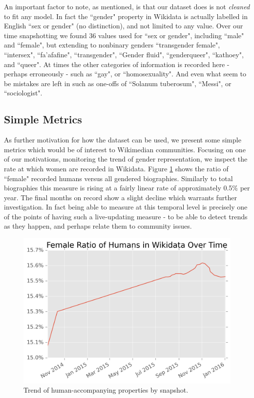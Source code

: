 \documentclass[letterpaper]{article}
\begin{document}
An important factor to note, as mentioned, is that our dataset does is not \textit{cleaned} to fit any model. In fact the ``gender" property in Wikidata is actually labelled in English ``sex or gender" (no distinction), and not limited to any value. Over our time snapshotting we found 36 values used for ``sex or gender", including ``male" and ``female", but extending to nonbinary genders ``transgender female", ``intersex", ``fa'afafine", ``transgender", ``Gender fluid",  ``genderqueer", ``kathoey", and ``queer". At times the other categories of information is recorded here - perhaps erroneously - such as ``gay", or ``homosexuality". And even what seem to be mistakes are left in such as one-offs of ``Solanum tuberosum", ``Messi", or ``sociologist".

\subsection{Simple Metrics}
As further motivation for how the dataset can be used, we present some simple metrics which would be of interest to Wikimedian communities. Focusing on one of our motivations, monitoring the trend of gender representation, we inspect the rate at which women are recorded in Wikidata. Figure \ref{fig:frb} shows the ratio of ``female" recorded humans versus all gendered biographies. Similarly to total biographies this measure is rising at a fairly linear rate of approximately 0.5\% per year. The final months on record show a slight decline which warrants further investigation. In fact being able to measure at this temporal level is precisely one of the points of having such a live-updating measure - to be able to detect trends as they happen, and perhaps relate them to community issues. 

\begin{figure}
\label{fig:frb}
\includegraphics[scale=0.6]{figures/frbwikidata.png} 
\caption{Trend of human-accompanying properties by snapshot.}
\end{figure}
\end{document}
